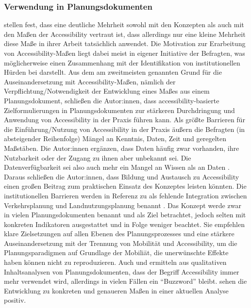 \documentclass[11pt,pdftex,a4paper]{scrartcl}
\begin{document}
	\subsubsection{Verwendung in Planungsdokumenten}
	\textcite{boisjolyInsiderPlannersPerspective2017} stellen fest, dass eine deutliche Mehrheit sowohl mit den Konzepten als auch mit den Maßen der Accessibility vertraut ist, dass allerdings nur eine kleine Mehrheit diese Maße in ihrer Arbeit tatsächlich anwendet. Die Motivation zur Erarbeitung von Accessibility-Maßen liegt dabei meist in eigener Initiative der Befragten, was möglicherweise einen Zusammenhang mit der Identifikation von institutionellen Hürden bei \textcite{silvaAccessibilityInstrumentsPlanning2017} darstellt. Aus dem am zweitmeisten genannten Grund für die Auseinandersetzung mit Accessibility-Maßen, nämlich der Verpflichtung/Notwendigkeit der Entwicklung eines Maßes aus einem Planungsdokument, schließen die Autor:innen, dass accessibility-basierte Zielformulierungen in Planungsdokumenten zur stärkeren Durchdringung und Anwendung von Accessibility in der Praxis führen kann. 
	Als größte Barrieren für die Einführung/Nutzung von Accessibility in der Praxis äußern die Befragten (in absteigender Reihenfolge) Mängel an Kenntnis, Daten, Zeit und geregelten Maßstäben. Die Autor:innen ergänzen, dass Daten häufig zwar vorhanden, ihre Nutzbarkeit oder der Zugang zu ihnen aber unbekannt sei. Die Datenverfügbarkeit sei also auch mehr ein Mangel an Wissen als an Daten \parencite[37]{boisjolyInsiderPlannersPerspective2017}. Daraus schließen die Autor:innen, dass Bildung und Austausch zu Accessibility einen großen Beitrag zum praktischen Einsatz des Konzeptes leisten könnten. Die institutionellen Barrieren werden in Referenz zu \textcite{papaAccessibilityInstrumentsPlanning2016} als fehlende Integration zwischen Verkehrsplanung und Landnutzungsplanung benannt \parencite[siehe auch][13]{kirchhoffOPNVPlanungFurLandliche2010}. Das Konzept werde zwar in vielen Planungsdokumenten benannt und als Ziel betrachtet, jedoch selten mit konkreten Indikatoren ausgestattet und in Folge weniger beachtet. Sie empfehlen klare Zielsetzungen auf allen Ebenen des Planungsprozesses und eine stärkere Auseinandersetzung mit der Trennung von Mobilität und Accessibility, um die Planungsparadigmen auf Grundlage der Mobiliät, die unerwünschte Effekte haben können \parencite[höhere Wegkosten, mehr Autoverkehr, ungleichere Verteilung von Accessibility, Sprawl][40]{boisjolyInsiderPlannersPerspective2017} nicht zu reproduzieren. Auch \textcite{cournoyerBuzzwordsEvaluatingIntegration2026} und \textcite{boisjolyHowGetThere2017} ermitteln aus qualitativen Inhaltsanalysen von Planungsdokumenten, dass der Begriff Accessibility immer mehr verwendet wird, allerdings in vielen Fällen ein \enquote{Buzzword} \parencite[45]{boisjolyHowGetThere2017} bleibt. \textcite[17]{cournoyerBuzzwordsEvaluatingIntegration2026} sehen die Entwicklung zu konkreten und genaueren Maßen in einer aktuellen Analyse positiv.
	
\end{document}
